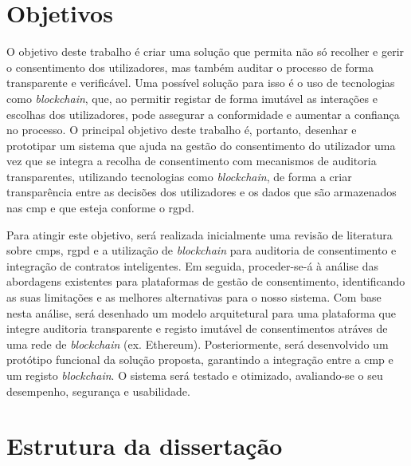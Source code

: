 \section{Objetivos}

O objetivo deste trabalho é criar uma solução que permita não só recolher e gerir o consentimento dos utilizadores, mas também auditar o processo de forma transparente e verificável. Uma possível solução para isso é o uso de tecnologias como \textit{blockchain}, que, ao permitir registar de forma imutável as interações e escolhas dos utilizadores, pode assegurar a conformidade e aumentar a confiança no processo. O principal objetivo deste trabalho é, portanto, desenhar e prototipar um sistema que ajuda na gestão do consentimento do utilizador uma vez que se integra a recolha de consentimento com mecanismos de auditoria transparentes, utilizando tecnologias como \textit{blockchain}, de forma a criar transparência entre as decisões dos utilizadores e os dados que são armazenados nas \acrshort{cmp} e que esteja conforme o \acrshort{rgpd}.

Para atingir este objetivo, será realizada inicialmente uma revisão de literatura sobre \acrshort{cmp}s, \acrshort{rgpd} e a utilização de \textit{blockchain} para auditoria de consentimento e integração de contratos inteligentes. Em seguida, proceder-se-á à análise das abordagens existentes para plataformas de gestão de consentimento, identificando as suas limitações e as melhores alternativas para o nosso sistema. Com base nesta análise, será desenhado um modelo arquitetural para uma plataforma que integre auditoria transparente e registo imutável de consentimentos atráves de uma rede de \textit{blockchain} (ex. Ethereum). Posteriormente, será desenvolvido um protótipo funcional da solução proposta, garantindo a integração entre a \acrshort{cmp} e um registo \textit{blockchain}. O sistema será testado e otimizado, avaliando-se o seu desempenho, segurança e usabilidade.

\section{Estrutura da dissertação}



